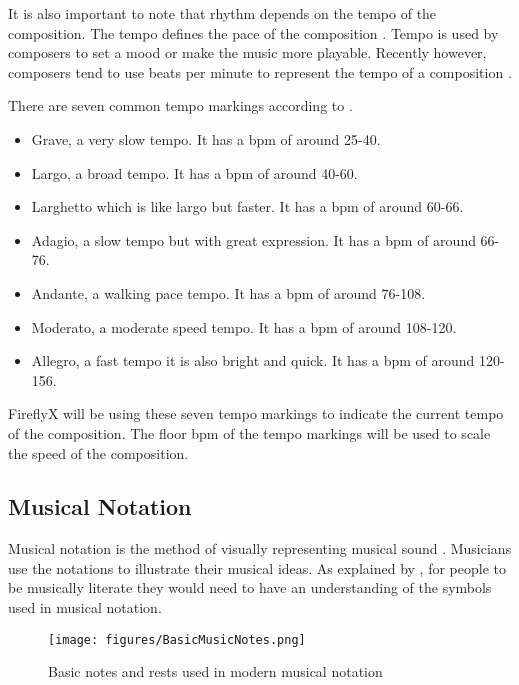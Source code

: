 It is also important to note that rhythm depends on the tempo of the composition. The tempo defines the pace of the composition \cite{rivadelo1986fundamentals, nelson2009foundations}. Tempo is used by composers to set a mood or make the music more playable. Recently however, composers tend to use beats per minute to represent the tempo of a composition \cite{nelson2009foundations}.

There are seven common tempo markings according to \citeauthor{nelson2009foundations}. 
\begin{itemize}
    \item Grave, a very slow tempo. It has a bpm of around 25-40.
    \item Largo, a broad tempo. It has a bpm of around 40-60.
    \item Larghetto which is like largo but faster. It has a bpm of around 60-66.
    \item Adagio, a slow tempo but with great expression. It has a bpm of around 66-76.
    \item Andante, a walking pace tempo. It has a bpm of around 76-108.
    \item Moderato, a moderate speed tempo. It has a bpm of around 108-120.
    \item Allegro, a fast tempo it is also bright and quick. It has a bpm of around 120-156. 
\end{itemize}

FireflyX will be using these seven tempo markings to indicate the current tempo of the composition. The floor bpm of the tempo markings will be used to scale the speed of the composition.

\subsection{Musical Notation}
Musical notation is the method of visually representing musical sound \cite{read1964music}. Musicians use the notations to illustrate their musical ideas. As explained by , for people to be musically literate they would need to have an understanding of the symbols used in musical notation.

\begin{figure}[H]
    \centering
    \texttt{[image: figures/BasicMusicNotes.png]}
    \caption{Basic notes and rests used in modern musical notation \protect\cite{BasicNotes2016}}
    \label{fig:BasicNotes2016}
\end{figure}

